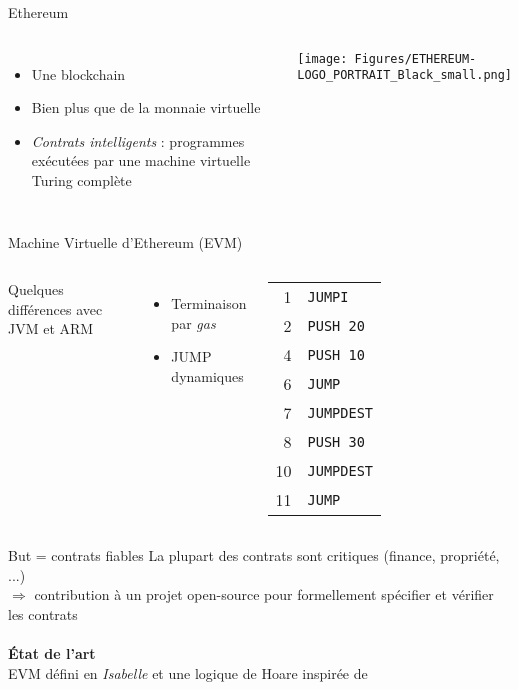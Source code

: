 \documentclass{beamer}
\begin{document}
\begin{frame}{Ethereum}
	\begin{columns}[c]
		\begin{itemize}
			\item Une blockchain
			\item Bien plus que de la monnaie virtuelle
			\item \textit{Contrats intelligents} : programmes ex\'{e}cut\'{e}es par une machine virtuelle Turing compl\`{e}te
		\end{itemize}
		\texttt{[image: Figures/ETHEREUM-LOGO\_PORTRAIT\_Black\_small.png]}
	\end{columns}
\end{frame}

\begin{frame}{Machine Virtuelle d'Ethereum (EVM) \footnotesize{\cite{wood2014ethereum}}}
	\begin{columns}[c]
		Quelques diff\'{e}rences avec JVM et ARM
		\begin{itemize}
			\item Terminaison par \textit{gas}
			\item JUMP dynamiques
		\end{itemize}
		\begin{tabular}{r l}
			1 & \texttt{JUMPI} \\
			2 & \texttt{PUSH~20}\\
			4 & \texttt{PUSH~10}\\
			6 & \texttt{JUMP}\\
			7 & \texttt{JUMPDEST}\\
			8 & \texttt{PUSH~30}\\
			10 & \texttt{JUMPDEST}\\
			11 & \texttt{JUMP}
		\end{tabular}
	\end{columns}
\end{frame}

\begin{frame}{But = contrats fiables}
	La plupart des contrats sont critiques (finance, propri\'{e}t\'{e}, ...)\\
	$\Rightarrow$ contribution \`{a} un projet open-source pour formellement sp\'{e}cifier et v\'{e}rifier les contrats
	\\ ~ \\
	\textbf{\'{E}tat de l'art} \\
	EVM d\'{e}fini en \textit{Isabelle} \cite{hirai2017defining} et une logique de Hoare inspir\'{e}e de \cite{Myreen09}
\end{frame}
\end{document}
